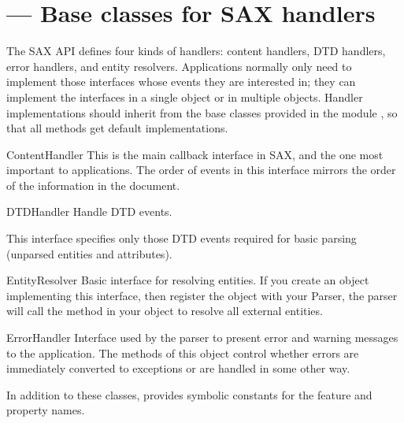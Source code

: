 \section{ ---
         Base classes for SAX handlers}




The SAX API defines four kinds of handlers: content handlers, DTD
handlers, error handlers, and entity resolvers. Applications normally
only need to implement those interfaces whose events they are
interested in; they can implement the interfaces in a single object or
in multiple objects. Handler implementations should inherit from the
base classes provided in the module , so that all
methods get default implementations.

\begin{classdesc*}{ContentHandler}
  This is the main callback interface in SAX, and the one most
  important to applications. The order of events in this interface
  mirrors the order of the information in the document.
\end{classdesc*}

\begin{classdesc*}{DTDHandler}
  Handle DTD events.

  This interface specifies only those DTD events required for basic
  parsing (unparsed entities and attributes).
\end{classdesc*}

\begin{classdesc*}{EntityResolver}
 Basic interface for resolving entities. If you create an object
 implementing this interface, then register the object with your
 Parser, the parser will call the method in your object to resolve all
 external entities.
\end{classdesc*}

\begin{classdesc*}{ErrorHandler}
  Interface used by the parser to present error and warning messages
  to the application.  The methods of this object control whether errors
  are immediately converted to exceptions or are handled in some other
  way.
\end{classdesc*}

In addition to these classes,  provides
symbolic constants for the feature and property names.

